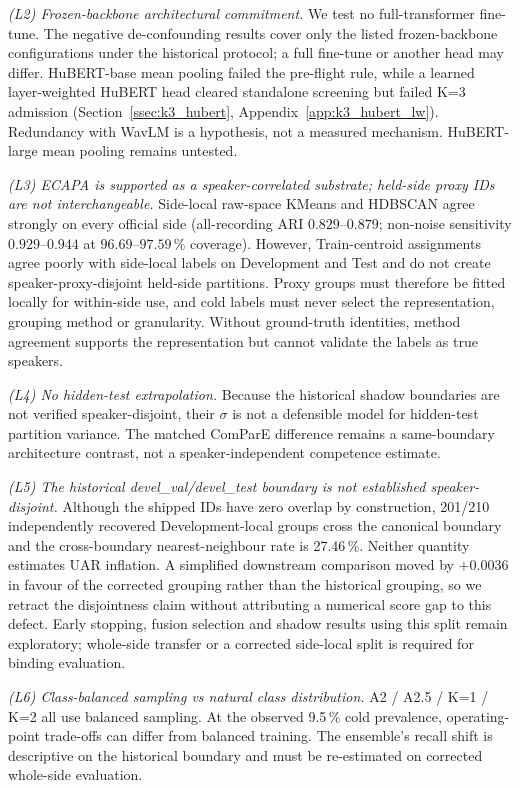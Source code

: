 \textit{(L2) Frozen-backbone architectural commitment.} We test no full-transformer fine-tune. The negative de-confounding results cover only the listed frozen-backbone configurations under the historical protocol; a full fine-tune or another head may differ. HuBERT-base mean pooling failed the pre-flight rule, while a learned layer-weighted HuBERT head cleared standalone screening but failed K=3 admission (Section~\ref{ssec:k3_hubert}, Appendix~\ref{app:k3_hubert_lw}). Redundancy with WavLM is a hypothesis, not a measured mechanism. HuBERT-large mean pooling remains untested.

\textit{(L3) ECAPA is supported as a speaker-correlated substrate; held-side proxy IDs are not interchangeable.} Side-local raw-space KMeans and HDBSCAN agree strongly on every official side (all-recording ARI $0.829$--$0.879$; non-noise sensitivity $0.929$--$0.944$ at $96.69$--$97.59\,\%$ coverage). However, Train-centroid assignments agree poorly with side-local labels on Development and Test and do not create speaker-proxy-disjoint held-side partitions. Proxy groups must therefore be fitted locally for within-side use, and cold labels must never select the representation, grouping method or granularity. Without ground-truth identities, method agreement supports the representation but cannot validate the labels as true speakers.

\textit{(L4) No hidden-test extrapolation.} Because the historical shadow boundaries are not verified speaker-disjoint, their $\sigma$ is not a defensible model for hidden-test partition variance. The matched ComParE difference remains a same-boundary architecture contrast, not a speaker-independent competence estimate.

\textit{(L5) The historical devel\_val/devel\_test boundary is not established speaker-disjoint.} Although the shipped IDs have zero overlap by construction, 201/210 independently recovered Development-local groups cross the canonical boundary and the cross-boundary nearest-neighbour rate is 27.46\,\%. Neither quantity estimates UAR inflation. A simplified downstream comparison moved by $+0.0036$ in favour of the corrected grouping rather than the historical grouping, so we retract the disjointness claim without attributing a numerical score gap to this defect. Early stopping, fusion selection and shadow results using this split remain exploratory; whole-side transfer or a corrected side-local split is required for binding evaluation.

\textit{(L6) Class-balanced sampling vs natural class distribution.} A2 / A2.5 / K=1 / K=2 all use balanced sampling. At the observed 9.5\,\% cold prevalence, operating-point trade-offs can differ from balanced training. The ensemble's recall shift is descriptive on the historical boundary and must be re-estimated on corrected whole-side evaluation.
